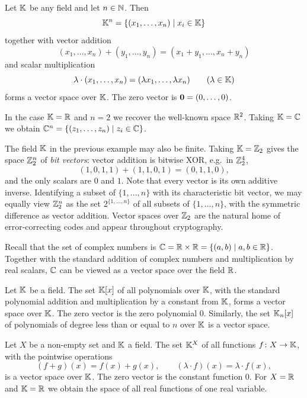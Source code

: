 \begin{example}
Let $\mathbb{K}$ be any field and let $n\in \mathbb{N}$. Then
\[
\mathbb{K}^n=\{(x_1,\ldots,x_n)\mid x_i\in \mathbb{K}\}
\]
together with vector addition
\[
(x_1,\ldots,x_n) + (y_1,\ldots,y_n) = (x_1+y_1,\ldots,x_n+y_n)
\]
and scalar multiplication
\[
\lambda\cdot (x_1,\ldots,x_n) = (\lambda x_1,\ldots,\lambda x_n) \qquad (\lambda \in \mathbb{K})
\]
forms a vector space over $\mathbb{K}$. The zero vector is $\mathbf{0} = (0,\ldots,0)$.

In the case $\mathbb{K}=\mathbb{R}$ and $n=2$ we recover the well-known space $\mathbb{R}^2$. Taking $\mathbb{K}=\mathbb{C}$ we obtain
$\mathbb{C}^n = \{(z_1,\ldots, z_n)\mid z_i\in\mathbb{C}\}$.
\end{example}

\begin{example}
The field $\mathbb{K}$ in the previous example may also be finite. Taking $\mathbb{K}=\mathbb{Z}_2$ gives the space $\mathbb{Z}_2^n$ of
\emph{bit vectors}: vector addition is bitwise XOR, e.g.\ in $\mathbb{Z}_2^4$,
\[
(1,0,1,1)+(1,1,0,1) = (0,1,1,0),
\]
and the only scalars are $0$ and $1$. Note that every vector is its own additive inverse. Identifying a
subset of $\{1,\ldots,n\}$ with its characteristic bit vector, we may equally view $\mathbb{Z}_2^n$ as the set
$2^{\{1,\ldots,n\}}$ of all subsets of $\{1,\ldots,n\}$, with the symmetric difference as vector addition.
Vector spaces over $\mathbb{Z}_2$ are the natural home of error-correcting codes and appear throughout
cryptography.
\end{example}

\begin{example}
Recall that the set of complex numbers is $\mathbb{C} = \mathbb{R}\times\mathbb{R} =\{(a,b)\mid a,b\in \mathbb{R}\}$. Together with the
standard addition of complex numbers and multiplication by real scalars, $\mathbb{C}$ can be viewed as a vector
space over the field $\mathbb{R}$.
\end{example}

\begin{example}[Polynomials]
Let $\mathbb{K}$ be a field. The set $\mathbb{K}[x]$ of all polynomials over $\mathbb{K}$, with the standard polynomial addition and
multiplication by a constant from $\mathbb{K}$, forms a vector space over $\mathbb{K}$. The zero vector is the zero
polynomial $0$. Similarly, the set $\mathbb{K}_n[x]$ of polynomials of degree less than or equal to $n$ over $\mathbb{K}$
is a vector space.
\end{example}

\begin{example}
Let $X$ be a non-empty set and $\mathbb{K}$ a field. The set $\mathbb{K}^X$ of all functions $f\colon X\to \mathbb{K}$, with the
pointwise operations
\[
(f+g)(x) = f(x)+g(x), \qquad (\lambda\cdot f)(x) = \lambda\cdot f(x),
\]
is a vector space over $\mathbb{K}$. The zero vector is the constant function $0$. For $X=\mathbb{R}$ and $\mathbb{K}=\mathbb{R}$ we obtain
the space of all real functions of one real variable.
\end{example}

